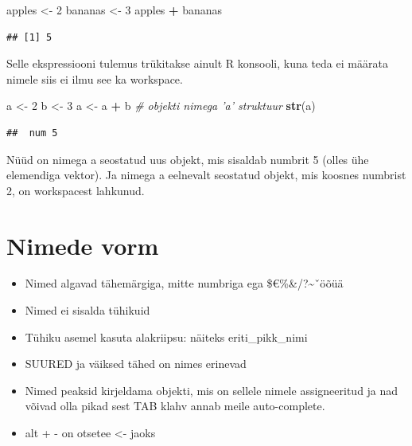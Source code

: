 \documentclass[]{book}
\newcommand{\euro}{€}
\newenvironment{Shaded}{\begin{snugshade}}{\end{snugshade}}
\newcommand{\KeywordTok}[1]{\textcolor[rgb]{0.13,0.29,0.53}{\textbf{#1}}}
\newcommand{\DecValTok}[1]{\textcolor[rgb]{0.00,0.00,0.81}{#1}}
\newcommand{\StringTok}[1]{\textcolor[rgb]{0.31,0.60,0.02}{#1}}
\newcommand{\CommentTok}[1]{\textcolor[rgb]{0.56,0.35,0.01}{\textit{#1}}}
\newcommand{\OperatorTok}[1]{\textcolor[rgb]{0.81,0.36,0.00}{\textbf{#1}}}
\newcommand{\NormalTok}[1]{#1}
\begin{document}
\begin{Shaded}
\begin{Highlighting}[]
\NormalTok{apples <-}\StringTok{ }\DecValTok{2}
\NormalTok{bananas <-}\StringTok{ }\DecValTok{3}
\NormalTok{apples }\OperatorTok{+}\StringTok{ }\NormalTok{bananas}
\end{Highlighting}
\end{Shaded}

\begin{verbatim}
## [1] 5
\end{verbatim}

Selle ekspressiooni tulemus trükitakse ainult R konsooli, kuna teda ei
määrata nimele siis ei ilmu see ka workspace.

\begin{Shaded}
\begin{Highlighting}[]
\NormalTok{a <-}\StringTok{ }\DecValTok{2}
\NormalTok{b <-}\StringTok{ }\DecValTok{3}
\NormalTok{a <-}\StringTok{ }\NormalTok{a }\OperatorTok{+}\StringTok{ }\NormalTok{b}
\CommentTok{# objekti nimega 'a' struktuur}
\KeywordTok{str}\NormalTok{(a)}
\end{Highlighting}
\end{Shaded}

\begin{verbatim}
##  num 5
\end{verbatim}

Nüüd on nimega a seostatud uus objekt, mis sisaldab numbrit 5 (olles ühe
elemendiga vektor). Ja nimega a eelnevalt seostatud objekt, mis koosnes
numbrist 2, on workspacest lahkunud.

\section{Nimede vorm}\label{nimede-vorm}

\begin{itemize}
\item
  Nimed algavad tähemärgiga, mitte numbriga ega
  \$\euro{}\%\&/?\textasciitilde{}ˇöõüä
\item
  Nimed ei sisalda tühikuid
\item
  Tühiku asemel kasuta alakriipsu: näiteks eriti\_pikk\_nimi
\item
  SUURED ja väiksed tähed on nimes erinevad
\item
  Nimed peaksid kirjeldama objekti, mis on sellele nimele assigneeritud
  ja nad võivad olla pikad sest TAB klahv annab meile auto-complete.
\item
  alt + - on otsetee \textless{}- jaoks
\end{itemize}
\end{document}
